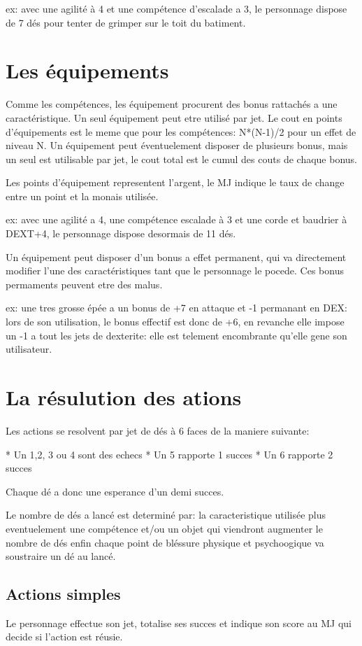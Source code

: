 \documentclass[a4paper,twocolumn]{article}
\begin{document}
ex: avec une agilité à 4 et une compétence d'escalade a 3, le personnage dispose de 7 dés pour tenter de grimper sur le toit du batiment.

\section{Les équipements}

Comme les compétences, les équipement procurent des bonus rattachés a une caractéristique. Un seul équipement peut etre utilisé par jet. Le cout en points d'équipements est le meme que pour les compétences: N*(N-1)/2 pour un effet de niveau N. Un équipement peut éventuelement disposer de plusieurs bonus, mais un seul est utilisable par jet, le cout total est le cumul des couts de chaque bonus. 

Les points d'équipement representent l'argent, le MJ indique le taux de change entre un point et la monais utilisée.

ex: avec une agilité a 4, une compétence escalade à 3 et une corde et baudrier à DEXT+4, le personnage dispose desormais de 11 dés.

Un équipement peut disposer d'un bonus a effet permanent, qui va directement modifier l'une des caractéristiques tant que le personnage le pocede. Ces bonus permaments peuvent etre des malus. 

ex: une tres grosse épée a un bonus de +7 en attaque et -1 permanant en DEX: lors de son utilisation, le bonus effectif est donc de +6, en revanche elle impose un -1 a tout les jets de dexterite: elle est telement encombrante qu'elle gene son utilisateur. 

\section{La résulution des ations}
	
Les actions se resolvent par jet de dés à 6 faces de la maniere suivante: 

* Un 1,2, 3 ou 4 sont des echecs
* Un 5 rapporte 1 succes
* Un 6 rapporte 2 succes
	
Chaque dé a donc une esperance d'un demi succes.
	
Le nombre de dés a lancé est determiné par: la caracteristique utilisée plus eventuelement une compétence et/ou un objet qui viendront augmenter le nombre de dés enfin chaque point de bléssure physique et psychoogique va soustraire un dé au lancé.
	
\subsection{Actions simples}
Le personnage effectue son jet, totalise ses succes et indique son score au MJ qui decide si l'action est réusie.
	
\end{document}
